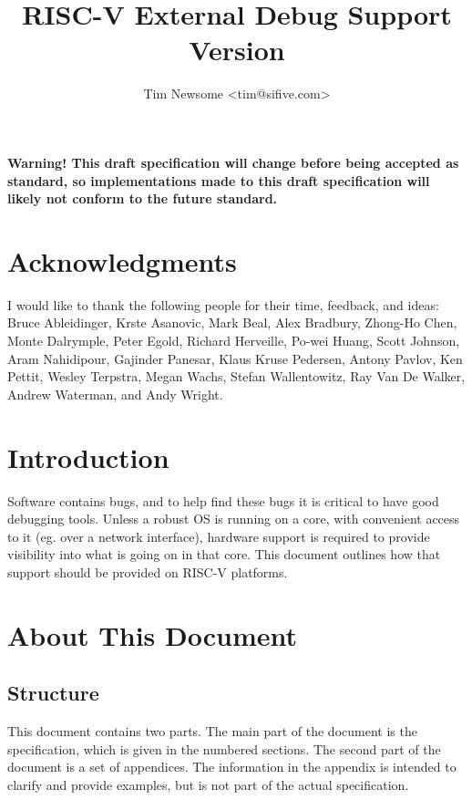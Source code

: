 \documentclass{article}
\title{RISC-V External Debug Support\\
Version \versionnum\\
\GITHash
}
\author{Tim Newsome \textless tim@sifive.com\textgreater}
\date{\GITAuthorDate}
\begin{document}
\maketitle

{\bf Warning! This draft specification will change before being accepted as
standard, so implementations made to this draft specification will likely not
conform to the future standard.}

\tableofcontents
\listoffigures
\listoftables

\newpage

\section*{Acknowledgments}

I would like to thank the following people for their time, feedback, and ideas:
Bruce Ableidinger,
Krste Asanovic,
Mark Beal,
Alex Bradbury,
Zhong-Ho Chen,
Monte Dalrymple,
Peter Egold,
Richard Herveille,
Po-wei Huang,
Scott Johnson,
Aram Nahidipour,
Gajinder Panesar,
Klaus Kruse Pedersen,
Antony Pavlov,
Ken Pettit,
Wesley Terpstra,
Megan Wachs,
Stefan Wallentowitz,
Ray Van De Walker,
Andrew Waterman,
and Andy Wright.

\section{Introduction}

Software contains bugs, and to help find these bugs it is critical to have good
debugging tools. Unless a robust OS is running on a core, with convenient
access to it (eg. over a network interface), hardware support is required to
provide visibility into what is going on in that core.  This document outlines
how that support should be provided on RISC-V platforms.

\section{About This Document}

\subsection{Structure}

This document contains two parts. The main part of the document is the
specification, which is given in the numbered sections. The second part
of the document is a set of  appendices. The information
in the appendix is intended to clarify and provide examples, but is
not part of the actual specification.
\end{document}
